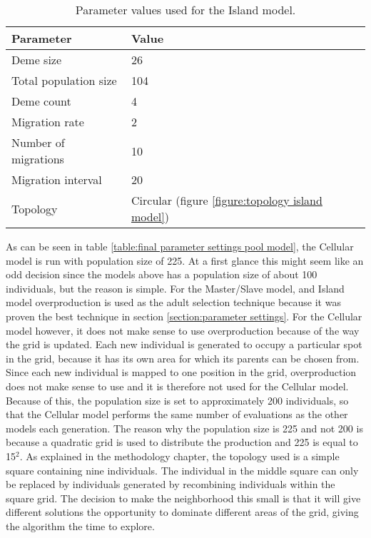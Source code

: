 \begin{table}[h!]
\centering
\caption{Parameter values used for the Island model.}
\label{table:final parameter settings island model}
\begin{tabular}{l|l}
\textbf{Parameter} & \textbf{Value} \\ 
\hline 
Deme size & 26 \\
Total population size & 104 \\  
Deme count & 4 \\
Migration rate & 2 \\
Number of migrations & 10 \\ 
Migration interval & 20 \\
Topology & Circular (figure \ref{figure:topology island model}) \\
\end{tabular}
\end{table}

\noindent As can be seen in table \ref{table:final parameter settings pool model}, the Cellular model is run with population size of 225. At a first glance this might seem like an odd decision since the models above has a population size of about 100 individuals, but the reason is simple. For the Master/Slave model, and Island model overproduction is used as the adult selection technique because it was proven the best technique in section \ref{section:parameter settings}. For the Cellular model however, it does not make sense to use overproduction because of the way the grid is updated. Each new individual is generated to occupy a particular spot in the grid, because it has its own area for which its parents can be chosen from. Since each new individual is mapped to one position in the grid, overproduction does not make sense to use and it is therefore not used for the Cellular model. Because of this, the population size is set to approximately 200 individuals, so that the Cellular model performs the same number of evaluations as the other models each generation. The reason why the population size is 225 and not 200 is because a quadratic grid is used to distribute the production and 225 is equal to 15$^{2}$. As explained in the methodology chapter, the topology used is a simple square containing nine individuals. The individual in the middle square can only be replaced by individuals generated by recombining individuals within the square grid. The decision to make the neighborhood this small is that it will give different solutions the opportunity to dominate different areas of the grid, giving the algorithm the time to explore.\\


